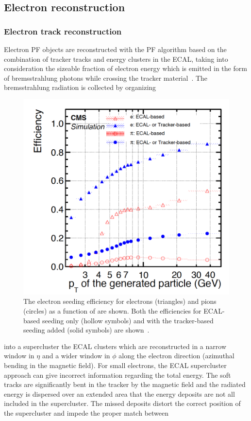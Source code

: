 \subsection{Electron reconstruction}\label{sec:c2ele}

\subsubsection{Electron track reconstruction}\label{sec:trackele}

Electron PF objects are reconstructed with the PF algorithm 
based on the combination of tracker tracks and energy clusters in the 
ECAL, taking into consideration the sizeable fraction
of electron energy which is emitted in the form of bremsstrahlung photons while
crossing the tracker material~\cite{CMS:particleflow}. The bremsstrahlung radiation is collected
by organizing
\begin{figure}
\centering
\includegraphics[width=.48\textwidth]{Figures/c2/eleecal}
  \caption{The electron seeding efficiency for electrons (triangles) and pions (circles) as a
function of \pt are shown. Both the efficiencies for ECAL-based
seeding only (hollow symbols) and with the tracker-based seeding added
(solid symbols) are shown~\cite{CMS:particleflow}.}
  \label{fig:c2ele}
\end{figure} 
 into a supercluster the ECAL clusters which are
reconstructed in a narrow window in $\eta$ and a wider window in $\phi$ along the electron direction (azimuthal
bending in the magnetic field).
For small \pt electrons, the ECAL supercluster approach can give
incorrect information regarding the total energy. The soft tracks are
significantly bent in the tracker by the magnetic field and the
radiated energy is dispersed over an extended area that the energy
deposits are not all
included in the supercluster. The missed deposits distort the correct
position of the supercluster and impede the proper match between
